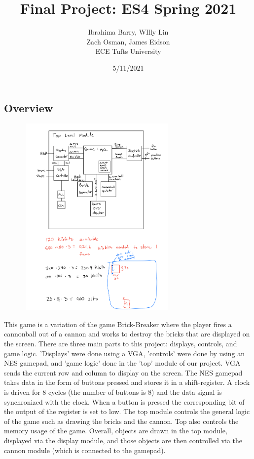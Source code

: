 \documentclass[12pt]{article}
\title{Final Project: ES4 Spring 2021}
\date{5/11/2021}
\author{Ibrahima Barry, WIlly Lin \\ Zach Osman, James Eidson \\ ECE Tufts University}
\begin{document}
\maketitle

\begin{flushleft}

\section{Overview}
\begin{center}
\includegraphics[width=10cm, height=10cm]{blockDiagram}
\end{center}
This game is a variation of the game Brick-Breaker where the player fires a
cannonball out of a cannon and works to destroy the bricks that are displayed on
the screen. There are three main parts to this project: displays, controls, and
game logic. 'Displays' were done using a VGA, 'controls' were done by using
an NES gamepad, and 'game logic' done in the 'top' module of our project. 
VGA sends the current row and column to display on the screen. The NES gamepad
takes data in the form of buttons pressed and stores it in a shift-register. A
clock is driven for 8 cycles (the number of buttons is 8) and the data signal is
synchronized with the clock. When a button is pressed the corresponding bit of
the output of the register is set to low. The top module controls the general
logic of the game such as drawing the bricks and the cannon. Top also controls
the memory usage of the game. Overall, objects are drawn in the top module,
displayed via the display module, and those objects are then controlled via the
cannon module (which is connected to the gamepad). 


\end{flushleft}
\end{document}
